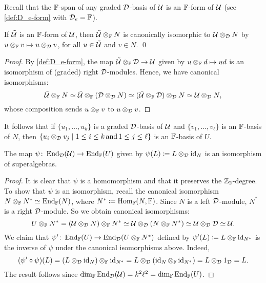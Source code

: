 Recall that the $\mathbb{F}$-span of any graded $\mathcal{D}$-basis of $\mathcal U$ is an $\mathbb{F}$-form of $\mathcal U$ (see \cref{def:D_e-form} with $\mathcal{D}_e = \mathbb{F}$). 

\begin{lemma}\label{lemma:FF-basis-for-U}
    If $\tilde{\mathcal U}$ is an $\mathbb{F}$-form of $\mathcal U$, then $\tilde{\mathcal U} \otimes_{\mathbb{F}} N$ is canonically isomorphic to $\mathcal U \otimes_{\mathcal{D}} N$ by $u\otimes_{\mathbb{F}} v \mapsto u\otimes_{\mathcal{D}} v$, for all $u\in \tilde{\mathcal U}$ and $v\in N$. \qed
\end{lemma}

\begin{proof}
    By \cref{def:D_e-form}, the map $\tilde {\mathcal U} \otimes_{\mathbb{F}} \mathcal{D} \to \mathcal U$ given by $u \otimes_{\mathbb{F}} d \mapsto ud$ is an isomorphism of (graded) right $\mathcal{D}$-modules. 
    Hence, we have canonical isomorphisms:
    \[
        \tilde{\mathcal U} \otimes_{\mathbb{F}} N \simeq \tilde{\mathcal U} \otimes_{\mathbb{F}} (\mathcal{D} \otimes_{\mathcal{D}} N) \simeq (\tilde{\mathcal U} \otimes_{\mathbb{F}} \mathcal{D}) \otimes_{\mathcal{D}} N \simeq \mathcal U \otimes_{\mathcal{D}} N,
    \]
    whose composition sends $u\otimes_{\mathbb{F}} v$ to $u\otimes_{\mathcal{D}} v$.
\end{proof}

It follows that if $\{ u_1, \ldots, u_k \}$ is a graded $\mathcal{D}$-basis of $\mathcal U$ and $\{ v_1, \ldots, v_\ell \}$ is an $\mathbb{F}$-basis of $N$, then $\{ u_i \otimes_{\mathcal{D}} v_j \mid 1\leq i \leq k \,\text{and}\, 1\leq j \leq \ell\}$ is an $\mathbb{F}$-basis of $U$. 

\begin{lemma}\label{lemma:End-over-D-becomes-over-FF}
    The map $\psi\colon \operatorname{End}_{\mathcal{D}}(\mathcal U) \to \operatorname{End}_{\mathbb{F}} (U)$ given by $\psi(L) \coloneqq L \otimes_{\mathcal{D}} \operatorname{id}_N$ is an isomorphism of superalgebras. 
\end{lemma}

\begin{proof}
    It is clear that $\psi$ is a homomorphism and that it preserves the $\mathbb{Z}_2$-degree. 
    To show that $\psi$ is an isomorphism, recall the canonical isomorphism $N\otimes_{\mathbb{F}} N^* \simeq \operatorname{End}_{\mathbb{F}} (N)$, where $N^* \coloneqq \operatorname{Hom}_{\mathbb{F}} (N, \mathbb{F})$. 
    Since $N$ is a left $\mathcal{D}$-module, $N^*$ is a right $\mathcal{D}$-module. 
    So we obtain canonical isomorphisms:
    \[
        U \otimes_{\mathbb{F}} N^* = (\mathcal U \otimes_{\mathcal{D}} N) \otimes_{\mathbb{F}} N^* \simeq \mathcal U \otimes_{\mathcal{D}} (N \otimes_{\mathbb{F}} N^*) \simeq \mathcal U\otimes_{\mathcal{D}} \mathcal{D} \simeq \mathcal U.
    \]
    We claim that $\psi'\colon \operatorname{End}_{\mathbb{F}} (U) \to \operatorname{End}_{\mathcal{D}} (U \otimes_{\mathbb{F}} N^*)$ defined by $\psi'(L) \coloneqq L \otimes_{\mathbb{F}} \operatorname{id}_{N^*}$ is the inverse of $\psi$ under the canonical isomorphisms above. 
    Indeed, 
    \[
        (\psi' \circ \psi) (L) = (L \otimes_{\mathcal{D}} \operatorname{id}_N) \otimes_{\mathbb{F}} \operatorname{id}_{N^*} = L \otimes_{\mathcal{D}} (\operatorname{id}_N \otimes_{\mathbb{F}} \operatorname{id}_{N^*}) = L \otimes_{\mathcal{D}} 1_{\mathcal{D}} = L.
    \]
    The result follows since $\dim_{\mathbb{F}} \operatorname{End}_{\mathcal{D}}(\mathcal U) = k^2\ell^2 = \dim_{\mathbb{F}} \operatorname{End}_{\mathbb{F}} (U)$. 
\end{proof}

